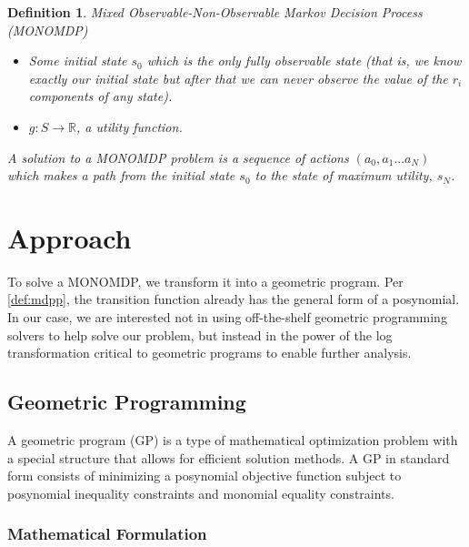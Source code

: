 \documentclass[11pt]{article}
\newtheorem{definition}{Definition}
\begin{document}
\begin{definition}{Mixed Observable-Non-Observable Markov Decision Process (MONOMDP) }
\begin{itemize}
  \item Some initial state $s_0$ which is the only fully observable
    state (that is, we know exactly our initial state but after that
    we can never observe the value of the $r_i$ components of any
    state).

  \item $g: S \rightarrow \mathbb{R}$, a utility function.
  \end{itemize}

  A solution to a MONOMDP problem is a sequence of actions
  $(a_0,a_1...a_N)$ which makes a path from the initial state $s_0$ to
  the state of maximum utility, $s_N$.

\end{definition}

\section{Approach}

To solve a MONOMDP, we transform it into a geometric program. Per
\autoref{def:mdpp}, the transition function already has the general
form of a posynomial. In our case, we are interested not in using
off-the-shelf geometric programming solvers to help solve our problem,
but instead in the power of the log transformation critical to
geometric programs to enable further analysis.

\subsection{Geometric Programming}

A geometric program (GP) is a type of mathematical optimization
problem with a special structure that allows for efficient solution
methods. A GP in standard form consists of minimizing a posynomial
objective function subject to posynomial inequality constraints and
monomial equality constraints.

\subsubsection{Mathematical Formulation}
\end{document}
